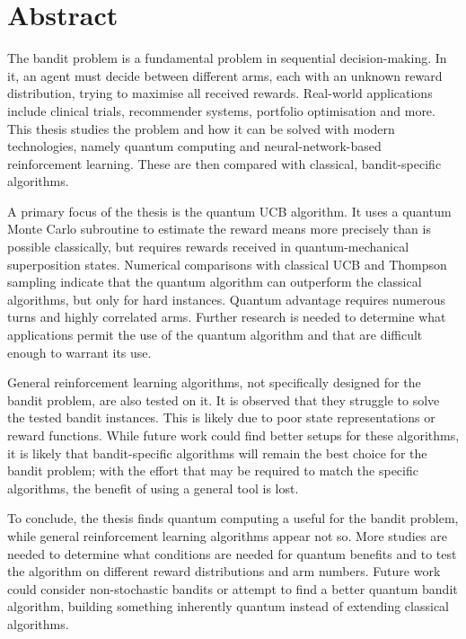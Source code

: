 \chapter{Abstract}

The bandit problem is a fundamental problem in sequential decision-making.
In it, an agent must decide between different arms, each with an unknown reward distribution, trying to maximise all received rewards.
Real-world applications include clinical trials, recommender systems, portfolio optimisation and more.
This thesis studies the problem and how it can be solved with modern technologies, namely quantum computing and neural-network-based reinforcement learning.
These are then compared with classical, bandit-specific algorithms.

A primary focus of the thesis is the quantum UCB algorithm.
It uses a quantum Monte Carlo subroutine to estimate the reward means more precisely than is possible classically, but requires rewards received in quantum-mechanical superposition states.
Numerical comparisons with classical UCB and Thompson sampling indicate that the quantum algorithm can outperform the classical algorithms, but only for hard instances.
Quantum advantage requires numerous turns and highly correlated arms.
Further research is needed to determine what applications permit the use of the quantum algorithm and that are difficult enough to warrant its use.

General reinforcement learning algorithms, not specifically designed for the bandit problem, are also tested on it.
It is observed that they struggle to solve the tested bandit instances.
This is likely due to poor state representations or reward functions.
While future work could find better setups for these algorithms, it is likely that bandit-specific algorithms will remain the best choice for the bandit problem; with the effort that may be required to match the specific algorithms, the benefit of using a general tool is lost.

To conclude, the thesis finds quantum computing a useful for the bandit problem, while general reinforcement learning algorithms appear not so.
More studies are needed to determine what conditions are needed for quantum benefits and to test the algorithm on different reward distributions and arm numbers.
Future work could consider non-stochastic bandits or attempt to find a better quantum bandit algorithm, building something inherently quantum instead of extending classical algorithms.

\cleardoublepage